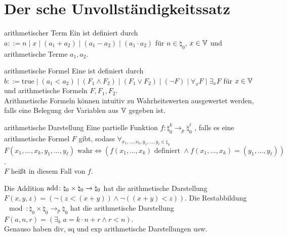 \section{%
    Der sche Unvollständigkeitssatz%
}

\begin{Def}{arithmetischer Term}
    Ein  ist definiert durch\\
    $a ::= n \;|\; x \;|\; (a_1 + a_2) \;|\; (a_1 - a_2) \;|\; (a_1 \cdot a_2)$
    für $n \in \natural_0$, $x \in \mathbb{V}$ und arithmetische Terme $a_1, a_2$.
\end{Def}

\begin{Def}{arithmetische Formel}
    Eine  ist definiert durch\\
    $b ::= \text{true} \;|\; (a_1 < a_2) \;|\; (F_1 \land F_2) \;|\;
    (F_1 \lor F_2) \;|\; (\lnot F) \;|\; \forall_x F \;|\; \exists_x F$
    für $x \in \mathbb{V}$ und arithmetische Formeln $F, F_1, F_2$.\\
    Arithmetische Formeln können intuitiv zu Wahrheitswerten ausgewertet werden, falls eine
    Belegung der Variablen aus $\mathbb{V}$ gegeben ist.
\end{Def}

\begin{Def}{arithmetische Darstellung}
    Eine partielle Funktion $f\colon \natural_0^k \rightarrow_p \natural_0^\ell$
    , falls es eine arithmetische Formel $F$ gibt,
    sodass $\forall_{x_1, \dotsc, x_k, y_1, \dotsc, y_\ell \in \natural_0}$\\
    $F(x_1, \dotsc, x_k, y_1, \dotsc, y_\ell) \text{ wahr} \iff
    (f(x_1, \dotsc, x_k) \text{ definiert } \land
    f(x_1, \dotsc, x_k) = (y_1, \dotsc, y_\ell))$.\\
    $F$ heißt in diesem Fall  von $f$.
\end{Def}

\begin{Bsp}
    Die Addition $\text{add}\colon \natural_0 \times \natural_0 \rightarrow \natural_0$ hat die
    arithmetische Darstellung\\
    $F(x, y, z) = (\lnot(z < (x + y)) \land \lnot((x + y) < z))$.
    Die Restabbildung $\mod\colon \natural_0 \times \natural_0 \rightarrow_p \natural_0$ hat
    die arithmetische Darstellung
    $F(a, n, r) = (\exists_k\; a = k \cdot n + r \land r < n)$.\\
    Genauso haben $\text{div}$, $\text{sq}$ und $\text{exp}$ arithmetische Darstellungen usw.
\end{Bsp}


